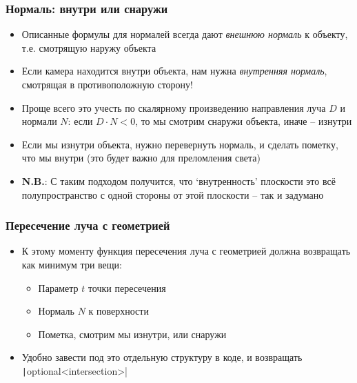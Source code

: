 \documentclass[10pt,handout]{beamer}
\begin{document}
\begin{frame}[fragile]
\frametitle{Нормаль: внутри или снаружи}
\begin{itemize}
\item Описанные формулы для нормалей всегда дают \textit{внешнюю нормаль} к объекту, т.е. смотрящую наружу объекта
\pause
\item Если камера находится внутри объекта, нам нужна \textit{внутренняя нормаль}, смотрящая в противоположную сторону!
\pause
\item Проще всего это учесть по скалярному произведению направления луча \begin{math}D\end{math} и нормали \begin{math}N\end{math}: если \begin{math}D\cdot N < 0\end{math}, то мы смотрим снаружи объекта, иначе -- изнутри
\pause
\item Если мы изнутри объекта, нужно перевернуть нормаль, и сделать пометку, что мы внутри (это будет важно для преломления света)
\pause
\item \alert{\textbf{N.B.}}: С таким подходом получится, что `внутренность' плоскости это всё полупространство с одной стороны от этой плоскости -- так и задумано
\end{itemize}
\end{frame}

\begin{frame}[fragile]
\frametitle{Пересечение луча с геометрией}
\begin{itemize}
\item К этому моменту функция пересечения луча с геометрией должна возвращать как минимум три вещи:
\pause
\begin{itemize}
\item Параметр \begin{math}t\end{math} точки пересечения
\pause
\item Нормаль \begin{math}N\end{math} к поверхности
\pause
\item Пометка, смотрим мы изнутри, или снаружи
\end{itemize}
\pause
\item Удобно завести под это отдельную структуру в коде, и возвращать \texttt|optional<intersection>|
\end{itemize}
\end{frame}
\end{document}
